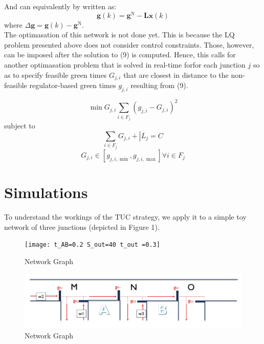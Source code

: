\documentclass[11pt]{article}
\begin{document}
And can equivalently by written as:
\begin{equation} 
\mathbf { g } ( k ) = \mathbf { g } ^ { \mathrm { N } } - \mathbf { L } \mathbf { x } ( k )
\end{equation}
where $\Delta \mathbf {g } = \mathbf { g } ( k ) - \mathbf {g } ^ { \mathrm { N } }$.\\


The optimasation of this network is not done yet. This is because the LQ problem presented above does not consider control constraints. Those, however, can be imposed after the solution to (9) is computed. Hence, this calls for another optimasation problem that is solved in real-time forfor each junction $j$ so as to specify feasible green times $G _ { j , i }$ that are closest in distance to the non-feasible regulator-based green times $g _ { j , i }$ resulting from (9).


\begin{equation} \operatorname { min } { G _ { j , i } } \sum _ { i \in F _ { j } } \left( g _ { j , i } - G _ { j , i } \right) ^ { 2 }\end{equation} 
subject to
\begin{equation} 
\sum _ { i \in F _ { j } } G _ { j , i } + \left| L _ { j } = C \right.
\end{equation} 
\begin{equation} 
G _ { j , i } \in \left[ g _ { j , i , \min } , g _ { j , i , \max } \right] \forall i \in F _ { j }
\end{equation} 

\section{Simulations}
To understand the workings of the TUC strategy, we apply it to a simple toy network of three junctions (depicted in Figure 1). 

\begin{figure}
    \caption{Network Graph}
      \centering
	\texttt{[image: t\_AB=0.2 S\_out=40 t\_out =0.3]}
\end{figure}

\begin{figure}
    \caption{Network Graph}
      \centering
	\includegraphics[width=15cm]{network-graph}
\end{figure}
\end{document}
